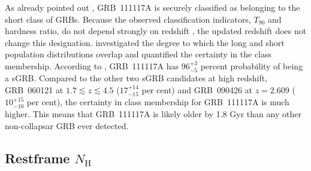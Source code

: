 \documentclass{aa}    %
\begin{document}
As already pointed out \citep{Margutti2012, Sakamoto2013}, GRB~111117A is
securely classified as belonging to the short class of GRBs. Because the
observed classification indicators, $T_{90}$ and hardness ratio, do not depend
strongly on redshift \citep{Littlejohns2013a}, the updated redshift does not
change this designation. %
\citet{Bromberg2013} investigated the degree to which the long and short
population distributions overlap and quantified the certainty in the class
membership. According to \citet{Bromberg2013}, GRB~111117A has $96_{-5}^{+3}$
percent probability of being a sGRB. Compared to the other two sGRB candidates
at high redshift, GRB~060121 \citep{DeUgartePostigo2006, Levan2006} at $1.7
\lesssim z \lesssim 4.5$ ($17_{-15}^{+14}$ per cent) and GRB~090426
\citep{Antonelli2009, Levesque2010, Thone2011} at $z = 2.609$ ($10_{-10}^{+15}$
per cent), the certainty in class membership for GRB~111117A is much higher.
This means that GRB~111117A is likely older by 1.8 Gyr than any other
non-collapsar GRB ever detected.



\subsection{Restframe $N_\mathrm{H}$} \label{restnH}
\end{document}

